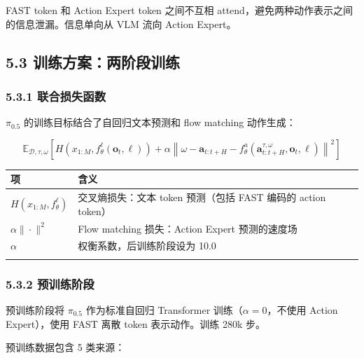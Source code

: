 \documentclass[
  chinese,
]{ctexart}
\begin{document}
FAST token 和 Action Expert token 之间不互相
attend，避免两种动作表示之间的信息泄漏。信息单向从 VLM 流向 Action
Expert。

\subsection{5.3
训练方案：两阶段训练}\label{ux8badux7ec3ux65b9ux6848ux4e24ux9636ux6bb5ux8badux7ec3}

\subsubsection{5.3.1
联合损失函数}\label{ux8054ux5408ux635fux5931ux51fdux6570}

\(\pi_{0.5}\) 的训练目标结合了自回归文本预测和 flow matching 动作生成：

\[
\mathbb{E}_{\mathcal{D}, \tau, \omega} \left[ H(x_{1:M}, f^\ell_\theta(\mathbf{o}_t, \ell)) + \alpha \left\| \omega - \mathbf{a}_{t:t+H} - f^a_\theta(\mathbf{a}^{\tau, \omega}_{t:t+H}, \mathbf{o}_t, \ell) \right\|^2 \right]
\]

\begin{center}
\begin{tabular}{@{}>{\raggedright\arraybackslash}p{} >{\raggedright\arraybackslash}p{}@{}}
\toprule\noalign{}
项 & 含义 \\
\midrule\noalign{}
\(H(x_{1:M}, f^\ell_\theta)\) & 交叉熵损失：文本 token 预测（包括 FAST 编码的 action token） \\
\(\alpha \|\cdot\|^2\) & Flow matching 损失：Action Expert 预测的速度场 \\
\(\alpha\) & 权衡系数，后训练阶段设为 10.0 \\
\bottomrule\noalign{}
\end{tabular}
\end{center}

\subsubsection{5.3.2 预训练阶段}\label{ux9884ux8badux7ec3ux9636ux6bb5}

预训练阶段将 \(\pi_{0.5}\) 作为标准自回归 Transformer
训练（\(\alpha = 0\)，不使用 Action Expert），使用 FAST 离散 token
表示动作。训练 280k 步。

预训练数据包含 5 类来源：
\end{document}
